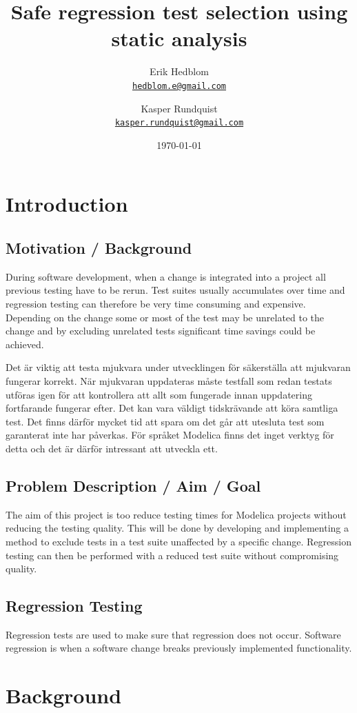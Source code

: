 \documentclass{cslthse-msc}
\author{
	Erik Hedblom \\
	{\normalsize \href{mailto:hedblom.e@gmail.com}{\texttt{hedblom.e@gmail.com}}}
	\and
	Kasper Rundquist \\
	{\normalsize \href{mailto:kasper.rundquist@gmail.com}{\texttt{kasper.rundquist@gmail.com}}}
}
\title{Safe regression test selection using static analysis}
\date{\today}
\begin{document}
\makefrontmatter
\chapter[Introduction]{Introduction}

\section{Motivation / Background}
During software development, when a change is integrated into a project all previous testing have to be rerun. Test suites usually accumulates over time and regression testing can therefore be very time consuming and expensive. Depending on the change some or most of the test may be unrelated to the change and by excluding unrelated tests significant time savings could be achieved. ~\cite{DUMMY}


Det är viktig att testa mjukvara under utvecklingen för säkerställa att mjukvaran fungerar korrekt. När mjukvaran uppdateras måste testfall som redan testats utföras igen för att kontrollera att allt som fungerade innan uppdatering fortfarande fungerar efter. Det kan vara väldigt tidskrävande att köra samtliga test. Det finns därför mycket tid att spara om det går att utesluta test som garanterat inte har påverkas. För språket Modelica finns det inget verktyg för detta och det är därför intressant att utveckla ett.

\section{Problem Description / Aim / Goal}

The aim of this project is too reduce testing times for Modelica projects without reducing the testing quality. This will be done by developing and implementing a method to exclude tests in a test suite unaffected by a specific change. Regression testing can then be performed with a reduced test suite without compromising quality.

\section{Regression Testing}
Regression tests are used to make sure that regression does not occur. Software regression is when a software change breaks previously implemented functionality.

\chapter[Background]{Background}
\end{document}
